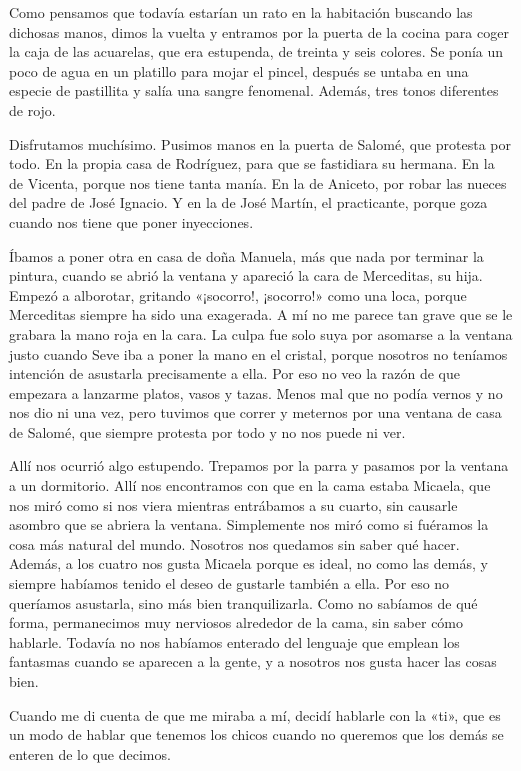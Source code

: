 \documentclass{barcodevapor3pags}
\begin{document}
Como pensamos que todavía estarían un rato en la habitación buscando las
dichosas manos, dimos la vuelta y entramos por la puerta de la cocina
para coger la caja de las acuarelas, que era estupenda, de treinta y
seis colores. Se ponía un poco de agua en un platillo para mojar el
pincel, después se untaba en una especie de pastillita y salía una
sangre fenomenal. Además, tres tonos diferentes de rojo.~

Disfrutamos muchísimo. Pusimos manos en la puerta de Salomé, que
protesta por todo. En la propia casa de Rodríguez, para que se
fastidiara su hermana. En la de Vicenta, porque nos tiene tanta manía.
En la de Aniceto, por robar las nueces del padre de José Ignacio. Y en
la de José Martín, el practicante, porque goza cuando nos tiene que
poner inyecciones.~

Íbamos a poner otra en casa de doña Manuela, más que nada por terminar
la pintura, cuando se abrió la ventana y apareció la cara de Merceditas,
su hija. Empezó a alborotar, gritando «¡socorro!, ¡socorro!» como una
loca, porque Merceditas siempre ha sido una exagerada. A mí no me parece
tan grave que se le grabara la mano roja en la cara. La culpa fue solo
suya por asomarse a la ventana justo cuando Seve iba a poner la mano en
el cristal, porque nosotros no teníamos intención de asustarla
precisamente a ella. Por eso no veo la razón de que empezara a lanzarme
platos, vasos y tazas. Menos mal que no podía vernos y no nos dio ni una
vez, pero tuvimos que correr y meternos por una ventana de casa de
Salomé, que siempre protesta por todo y no nos puede ni ver.~

Allí nos ocurrió algo estupendo. Trepamos por la parra y pasamos por la
ventana a un dormitorio. Allí nos encontramos con que en la cama estaba
Micaela, que nos miró como si nos viera mientras entrábamos a su cuarto,
sin causarle asombro que se abriera la ventana. Simplemente nos miró
como si fuéramos la cosa más natural del mundo. Nosotros nos quedamos
sin saber qué hacer. Además, a los cuatro nos gusta Micaela porque es
ideal, no como las demás, y siempre habíamos tenido el deseo de gustarle
también a ella. Por eso no queríamos asustarla, sino más bien
tranquilizarla. Como no sabíamos de qué forma, permanecimos muy
nerviosos alrededor de la cama, sin saber cómo hablarle. Todavía no nos
habíamos enterado del lenguaje que emplean los fantasmas cuando se
aparecen a la gente, y a nosotros nos gusta hacer las cosas bien.~

Cuando me di cuenta de que me miraba a mí, decidí hablarle con la «ti»,
que es un modo de hablar que tenemos los chicos cuando no queremos que
los demás se enteren de lo que decimos.~
\end{document}
